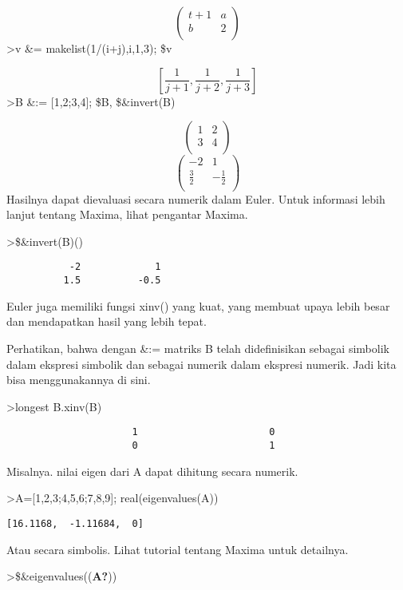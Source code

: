 \documentclass[
]{book}
\begin{document}
\[\begin{pmatrix}t+1 & a \\ b & 2 \\ \end{pmatrix}\]\textgreater v \&= makelist(1/(i+j),i,1,3); \$v

\[\left[ \frac{1}{j+1} , \frac{1}{j+2} , \frac{1}{j+3} \right] \]\textgreater B \&:= {[}1,2;3,4{]}; \$B, \$\&invert(B)

\[\begin{pmatrix}1 & 2 \\ 3 & 4 \\ \end{pmatrix}\]\[\begin{pmatrix}-2 & 1 \\ \frac{3}{2} & -\frac{1}{2} \\ 
 \end{pmatrix}\]Hasilnya dapat dievaluasi secara numerik dalam Euler. Untuk informasi lebih lanjut tentang Maxima, lihat pengantar Maxima.

\textgreater\$\&invert(B)()

\begin{verbatim}
           -2             1 
          1.5          -0.5 
\end{verbatim}

Euler juga memiliki fungsi xinv() yang kuat, yang membuat upaya lebih besar dan mendapatkan hasil yang lebih tepat.

Perhatikan, bahwa dengan \&:= matriks B telah didefinisikan sebagai simbolik dalam ekspresi simbolik dan sebagai numerik dalam ekspresi numerik. Jadi kita bisa menggunakannya di sini.

\textgreater longest B.xinv(B)

\begin{verbatim}
                      1                       0 
                      0                       1 
\end{verbatim}

Misalnya. nilai eigen dari A dapat dihitung secara numerik.

\textgreater A={[}1,2,3;4,5,6;7,8,9{]}; real(eigenvalues(A))

\begin{verbatim}
[16.1168,  -1.11684,  0]
\end{verbatim}

Atau secara simbolis. Lihat tutorial tentang Maxima untuk detailnya.

\textgreater\$\&eigenvalues((\textbf{A?}))
\end{document}
